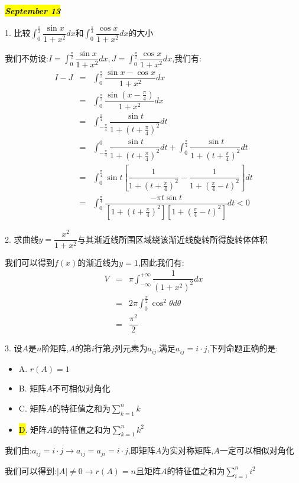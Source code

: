 \hl{\textbf{\textit{September 13}}}

1. 比较$\int_{0}^{\frac{\pi}{2}}\dfrac{\sin x}{1+x^2}dx$和$\int_{0}^{\frac{\pi}{2}}\dfrac{\cos x}{1+x^2}dx$的大小
\begin{solution}

	我们不妨设:$I=\int_{0}^{\frac{\pi}{2}}\dfrac{\sin x}{1+x^2}dx,J=\int_{0}^{\frac{\pi}{2}}\dfrac{\cos x}{1+x^2}dx$,我们有:
	\begin{eqnarray*}
		I-J&=&\int_{0}^{\frac{\pi}{2}}\dfrac{\sin x-\cos x}{1+x^2}dx\\
		&=&\int_{0}^{\frac{\pi}{2}}\dfrac{\sin(x-\frac{\pi}{4})}{1+x^2}dx\\
		&=&\int_{-\frac{\pi}{4}}^{\frac{\pi}{4}}\dfrac{\sin t}{1+(t+\frac{\pi}{4})^2}dt\\
		&=&\int_{-\frac{\pi}{4}}^{0}\dfrac{\sin t}{1+(t+\frac{\pi}{4})^2}dt+\int_{0}^{\frac{\pi}{4}}\dfrac{\sin t}{1+(t+\frac{\pi}{4})^2}dt\\
		&=&\int_{0}^{\frac{\pi}{4}}\sin t[\dfrac{1}{1+(t+\frac{\pi}{4})^2}-\dfrac{1}{1+(\frac{\pi}{4}-t)^2}]dt\\
		&=&\int_{0}^{\frac{\pi}{4}}\dfrac{-\pi t\sin t}{[1+(t+\frac{\pi}{4})^2][1+(\frac{\pi}{4}-t)^2]}dt<0
	\end{eqnarray*}
	
\end{solution}

2. 求曲线$y=\dfrac{x^2}{1+x^2}$与其渐近线所围区域绕该渐近线旋转所得旋转体体积
\begin{solution}

	我们可以得到$f(x)$的渐近线为$y=1$,因此我们有:
	\begin{eqnarray*}
		V&=&\pi\int_{-\infty}^{+\infty}\dfrac{1}{(1+x^2)^2}dx\\
		&=&2\pi\int_{0}^{\frac{\pi}{2}}\cos^2\theta d\theta\\
		&=&\dfrac{\pi^2}{2}
	\end{eqnarray*}
\end{solution}

3. 设$A$是$n$阶矩阵,$A$的第$i$行第$j$列元素为$a_{ij}$,满足$a_{ij}=i\cdot j$,下列命题正确的是:  
\begin{itemize}
	\item A. $r(A)=1$
	\item B. 矩阵$A$不可相似对角化
	\item C. 矩阵$A$的特征值之和为$\sum\limits_{k=1}^{n}k$
	\item \hl{D}. 矩阵$A$的特征值之和为$\sum\limits_{k=1}^{n}k^2$
\end{itemize}
\begin{solution}

	我们由:$a_{ij}=i\cdot j\rightarrow a_{ij}=a_{ji}=i\cdot j$,即矩阵$A$为实对称矩阵,$A$一定可以相似对角化
	
	我们可以得到:$|A|\neq 0\rightarrow r(A)=n$且矩阵$A$的特征值之和为$\sum\limits_{i=1}^{n}i^2$
\end{solution}

